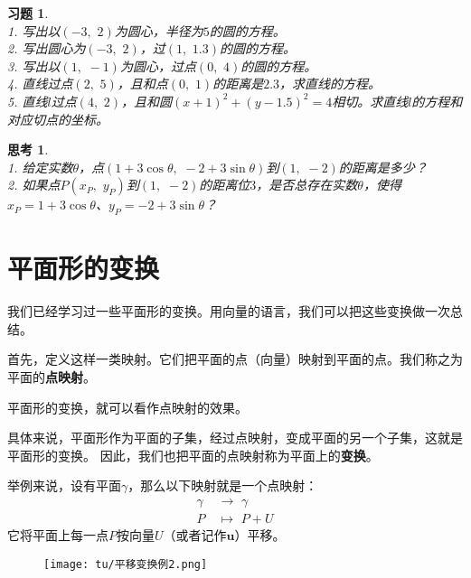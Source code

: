 \documentclass[12pt,UTF8]{ctexbook}
\theoremstyle{definition}
\theoremstyle{plain}
\newtheorem{sk}{思考}[section]
\newtheorem{xt}{习题}[section]
\begin{document}
\begin{xt}
    \mbox{}\\
    1. 写出以$(-3, \,\,2)$为圆心，半径为$5$的圆的方程。\\
    2. 写出圆心为$(-3, \,\,2)$，过$(1,\,\, 1.3)$的圆的方程。\\
    3. 写出以$(1, \,\,-1)$为圆心，过点$(0,\,\, 4)$的圆的方程。\\
    4. 直线过点$(2,\,\,5)$，且和点$(0,\,\,1)$的距离是$2.3$，求直线的方程。\\
    5. 直线$l$过点$(4,\,\,2)$，且和圆$(x+1)^2 + (y - 1.5)^2 = 4$相切。求直线$l$的方程和对应切点的坐标。
\end{xt}

\begin{sk}
    \mbox{}\\
    1. 给定实数$\theta$，点$(1 + 3\cos\theta, \,\, -2 + 3\sin\theta)$到$(1, \,\,-2)$的距离是多少？\\
    2. 如果点$P(x_P, \,\,y_P)$到$(1, \,\,-2)$的距离位$3$，是否总存在实数$\theta$，使得$x_P = 1 + 3\cos\theta$、$y_P = -2 + 3\sin\theta$？
\end{sk}

\section{平面形的变换}
我们已经学习过一些平面形的变换。用向量的语言，我们可以把这些变换做一次总结。

首先，定义这样一类映射。它们把平面的点（向量）映射到平面的点。我们称之为平面的\textbf{点映射}。

平面形的变换，就可以看作点映射的效果。

具体来说，平面形作为平面的子集，经过点映射，变成平面的另一个子集，这就是平面形的变换。
因此，我们也把平面的点映射称为平面上的\textbf{变换}。

举例来说，设有平面$\gamma$，那么以下映射就是一个点映射：
\begin{align*}
    \gamma \,\,&\rightarrow \,\, \gamma  \\
    P &\mapsto \,\, P + U 
\end{align*}
它将平面上每一点$P$按向量$U$（或者记作$\mathbf{u}$）平移。


\begin{figure}[h] %
    \vspace{4pt}
    \centering
    \texttt{[image: tu/平移变换例2.png]}
\end{figure}
\end{document}
